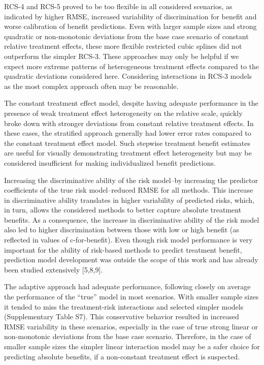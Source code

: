 \documentclass[]{elsarticle} %
\begin{document}
RCS-4 and RCS-5 proved to be too flexible in all considered scenarios,
as indicated by higher RMSE, increased variability of discrimination for
benefit and worse calibration of benefit predictions. Even with larger
sample sizes and strong quadratic or non-monotonic deviations from the
base case scenario of constant relative treatment effects, these more
flexible restricted cubic splines did not outperform the simpler RCS-3.
These approaches may only be helpful if we expect more extreme patterns
of heterogeneous treatment effects compared to the quadratic deviations
considered here. Considering interactions in RCS-3 models as the most
complex approach often may be reasonable.

The constant treatment effect model, despite having adequate performance
in the presence of weak treatment effect heterogeneity on the relative
scale, quickly broke down with stronger deviations from constant
relative treatment effects. In these cases, the stratified approach
generally had lower error rates compared to the constant treatment
effect model. Such stepwise treatment benefit estimates are useful for
visually demonstrating treatment effect heterogeneity but may be
considered insufficient for making individualized benefit predictions.

Increasing the discriminative ability of the risk model--by increasing
the predictor coefficients of the true risk model--reduced RMSE for all
methods. This increase in discriminative ability translates in higher
variability of predicted risks, which, in turn, allows the considered
methods to better capture absolute treatment benefits. As a consequence,
the increase in discriminative ability of the risk model also led to
higher discrimination between those with low or high benefit (as
reflected in values of c-for-benefit). Even though risk model
performance is very important for the ability of risk-based methods to
predict treatment benefit, prediction model development was outside the
scope of this work and has already been studied extensively {[}5,8,9{]}.

The adaptive approach had adequate performance, following closely on
average the performance of the ``true'' model in most scenarios. With
smaller sample sizes it tended to miss the treatment-risk interactions
and selected simpler models (Supplementary Table S7). This conservative
behavior resulted in increased RMSE variability in these scenarios,
especially in the case of true strong linear or non-monotonic deviations
from the base case scenario. Therefore, in the case of smaller sample
sizes the simpler linear interaction model may be a safer choice for
predicting absolute benefits, if a non-constant treatment effect is
suspected.
\end{document}
